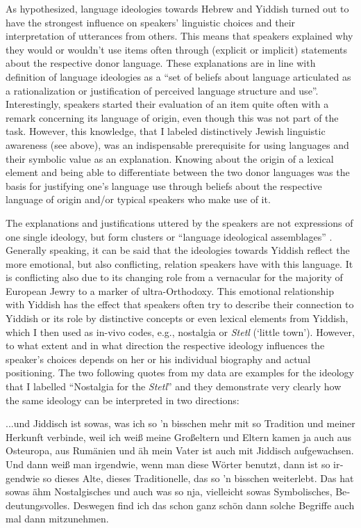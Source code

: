 \documentclass[output=paper]{langscibook}
\begin{document}
As hypothesized, language ideologies towards Hebrew and Yiddish turned out to have the strongest influence on speakers’ linguistic choices and their interpretation of utterances from others. This means that speakers explained why they would or wouldn’t use items often through (explicit or implicit) statements about the respective donor language. These explanations are in line with  definition of language ideologies as a “set of beliefs about language articulated as a rationalization or justification of perceived language structure and use”. Interestingly, speakers started their evaluation of an item quite often with a remark concerning its language of origin, even though this was not part of the task. However, this knowledge, that I labeled distinctively Jewish linguistic awareness (see above), was an indispensable prerequisite for using languages and their symbolic value as an explanation. Knowing about the origin of a lexical element and being able to differentiate between the two donor languages was the basis for justifying one’s language use through beliefs about the respective language of origin and/or typical speakers who make use of it.

The explanations and justifications uttered by the speakers are not expressions of one single ideology, but form clusters or ``language ideological assemblages'' \citep[134]{Kroskrity2018}. Generally speaking, it can be said that the ideologies towards Yiddish reflect the more emotional, but also conflicting, relation speakers have with this language. It is conflicting also due to its changing role from a vernacular for the majority of European Jewry to a marker of ultra-Orthodoxy. This emotional relationship with Yiddish has the effect that speakers often try to describe their connection to Yiddish or its role by distinctive concepts or even lexical elements from Yiddish, which I then used as in-vivo codes, e.g., nostalgia or \textit{Stetl} (‘little town’). However, to what extent and in what direction the respective ideology influences the speaker’s choices depends on her or his individual biography and actual positioning. The two following quotes from my data are examples for the ideology that I labelled “Nostalgia for the \textit{Stetl}” and they demonstrate very clearly how the same ideology can be interpreted in two directions:

\eanoraggedright%
\label{ex:jahns:4}
\begin{otherlanguage}{ngerman}
...und Jiddisch ist sowas, was ich so 'n bisschen mehr mit so Tradition und meiner Herkunft verbinde, weil ich weiß meine Großeltern und Eltern kamen ja auch aus Osteuropa, aus Rumänien und äh mein Vater ist auch mit Jiddisch aufgewachsen. Und dann weiß man irgendwie, wenn man diese Wörter benutzt, dann ist so irgendwie so dieses Alte, dieses Traditionelle, das so 'n bisschen weiterlebt. Das hat sowas ähm Nostalgisches und auch was so nja, vielleicht sowas Symbolisches, Bedeutungsvolles. Deswegen find ich das schon ganz schön dann solche Begriffe auch mal dann mitzunehmen. 
\end{otherlanguage}
\end{document}

